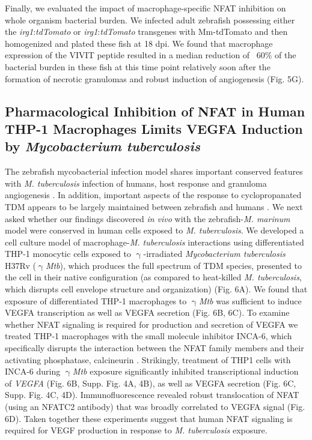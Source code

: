 Finally, we evaluated the impact of macrophage-specific NFAT inhibition on whole organism bacterial burden. We infected adult zebrafish possessing either the \textit{irg1}:\textit{tdTomato} or \textit{irg1}:\textit{tdTomato} transgenes with Mm-tdTomato and then homogenized and plated these fish at 18 dpi. We found that macrophage expression of the VIVIT peptide resulted in a median reduction of ~60\% of the bacterial burden in these fish at this time point relatively soon after the formation of necrotic granulomas and robust induction of angiogenesis (Fig. 5G).
 
\subsection{Pharmacological Inhibition of NFAT in Human \mbox{THP-1} Macrophages Limits VEGFA Induction by \textit{Mycobacterium tuberculosis}}

The zebrafish mycobacterial infection model shares important conserved features with \textit{M. tuberculosis} infection of humans, host response and granuloma angiogenesis \citep{Swaim2006, Datta2015, Oehlers2015, Cronan2021}. In addition, important aspects of the response to cyclopropanated TDM appears to be largely maintained between zebrafish and humans \citep{Walton2018}. We next asked whether our findings discovered \textit{in vivo} with the zebrafish-\textit{M. marinum} model were conserved in human cells exposed to \textit{M. tuberculosis}. We developed a cell culture model of macrophage-\textit{M. tuberculosis} interactions using differentiated THP-1 monocytic cells exposed to $\upgamma$-irradiated \textit{Mycobacterium tuberculosis} H37Rv ($\upgamma$\textit{Mtb}), which produces the full spectrum of TDM species, presented to the cell in their native configuration (as compared to heat-killed \textit{M. tuberculosis}, which disrupts cell envelope structure and organization) \citep{Romero2014, SecanellaFandos2014} (Fig. 6A). We found that exposure of differentiated THP-1 macrophages to $\upgamma$\textit{Mtb} was sufficient to induce VEGFA transcription as well as VEGFA secretion (Fig. 6B, 6C). To examine whether NFAT signaling is required for production and secretion of VEGFA we treated THP-1 macrophages with the small molecule inhibitor INCA-6, which specifically disrupts the interaction between the NFAT family members and their activating phosphatase, calcineurin \citep{Roehrl2004}. Strikingly, treatment of THP1 cells with INCA-6 during $\upgamma$\textit{Mtb} exposure significantly inhibited transcriptional induction of \textit{VEGFA} (Fig. 6B, Supp. Fig. 4A, 4B), as well as VEGFA secretion (Fig. 6C, Supp. Fig. 4C, 4D). Immunofluorescence revealed robust translocation of NFAT (using an NFATC2 antibody) that was broadly correlated to VEGFA signal (Fig. 6D). Taken together these experiments suggest that human NFAT signaling is required for VEGF production in response to \textit{M. tuberculosis} exposure.

